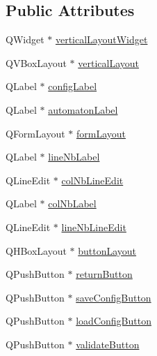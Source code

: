 \subsection*{Public Attributes}
\begin{DoxyCompactItemize}
\item 
Q\+Widget $\ast$ \mbox{\hyperlink{class_ui___config_day_and_night_automaton_window_a35db0f656f0cfc51ce1fdb6986f47d6b}{vertical\+Layout\+Widget}}
\item 
Q\+V\+Box\+Layout $\ast$ \mbox{\hyperlink{class_ui___config_day_and_night_automaton_window_ae6374a4fbcae7f2bee7c2e9c4a87b30d}{vertical\+Layout}}
\item 
Q\+Label $\ast$ \mbox{\hyperlink{class_ui___config_day_and_night_automaton_window_a1520b38c1acf33bd439ee1ff19d907b6}{config\+Label}}
\item 
Q\+Label $\ast$ \mbox{\hyperlink{class_ui___config_day_and_night_automaton_window_ab3a38b81a09348e5eeaf15e25298ceb6}{automaton\+Label}}
\item 
Q\+Form\+Layout $\ast$ \mbox{\hyperlink{class_ui___config_day_and_night_automaton_window_ae17c73120d7abdef7528087e38e12b69}{form\+Layout}}
\item 
Q\+Label $\ast$ \mbox{\hyperlink{class_ui___config_day_and_night_automaton_window_adbe9092a901be28d68dbb22dad3e9f9e}{line\+Nb\+Label}}
\item 
Q\+Line\+Edit $\ast$ \mbox{\hyperlink{class_ui___config_day_and_night_automaton_window_af3a6233e974f68e93d6c1017a46d9594}{col\+Nb\+Line\+Edit}}
\item 
Q\+Label $\ast$ \mbox{\hyperlink{class_ui___config_day_and_night_automaton_window_acb1a17a28281ffef2ce87410c04cea28}{col\+Nb\+Label}}
\item 
Q\+Line\+Edit $\ast$ \mbox{\hyperlink{class_ui___config_day_and_night_automaton_window_a163c0e035f6b6d0b86a729d4f0fcc6d3}{line\+Nb\+Line\+Edit}}
\item 
Q\+H\+Box\+Layout $\ast$ \mbox{\hyperlink{class_ui___config_day_and_night_automaton_window_a9094065f13d6f19e6762b1f3130feb39}{button\+Layout}}
\item 
Q\+Push\+Button $\ast$ \mbox{\hyperlink{class_ui___config_day_and_night_automaton_window_abdde50fe9b93aabf9d804fcc1e357e36}{return\+Button}}
\item 
Q\+Push\+Button $\ast$ \mbox{\hyperlink{class_ui___config_day_and_night_automaton_window_aa7b44da1ea788d8cea84a1140ddb97ef}{save\+Config\+Button}}
\item 
Q\+Push\+Button $\ast$ \mbox{\hyperlink{class_ui___config_day_and_night_automaton_window_a7ba4ceb4954483e511aade3df41ad62e}{load\+Config\+Button}}
\item 
Q\+Push\+Button $\ast$ \mbox{\hyperlink{class_ui___config_day_and_night_automaton_window_abad82f466bee7ee112037d7f5239f643}{validate\+Button}}
\end{DoxyCompactItemize}


